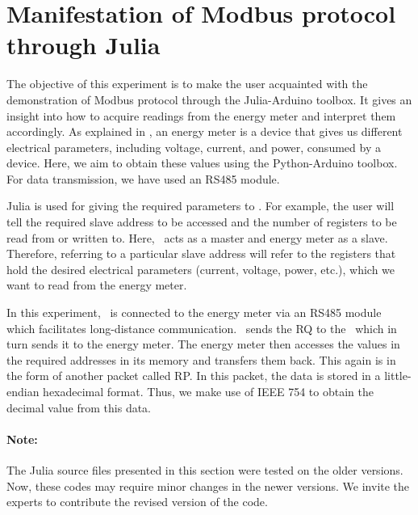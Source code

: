 
\section{Manifestation of Modbus protocol through Julia}
The objective of this experiment is to make the user acquainted with
the demonstration of Modbus protocol through the Julia-Arduino toolbox. 
It gives an insight into how to acquire readings from the energy meter and interpret them accordingly. As explained in , 
an energy meter is a device that gives us different electrical parameters, including voltage, current, and power, consumed by a device. Here, we aim to obtain these values using the Python-Arduino toolbox. For data transmission, we have used an RS485 module.

Julia is used for giving the required parameters to \arduino. For
example, the user will tell the required slave address to be accessed
and the number of registers to be read from or written to. Here,
\arduino\ acts as a master and energy meter as a slave. Therefore,
referring to a particular slave address will refer to the registers
that hold the desired electrical parameters (current, voltage, power, etc.), which we want to read from the energy meter.

In this experiment, \arduino\ is connected to the energy meter via an RS485 module which facilitates long-distance communication. 
\scilab\ sends the RQ to the \arduino\, which in turn sends it to the
energy meter. The energy meter then accesses the values in the
required addresses in its memory and transfers them back. This again
is in the form of another packet called RP. In this packet, the data is stored in a little-endian hexadecimal format. Thus, we make use of IEEE 754 to obtain the decimal value from this data. 

\paragraph{Note: } The Julia source files presented in this section were tested on the older versions. Now, these codes may require minor changes in
the newer versions. We invite the experts to contribute the revised version of the code.


